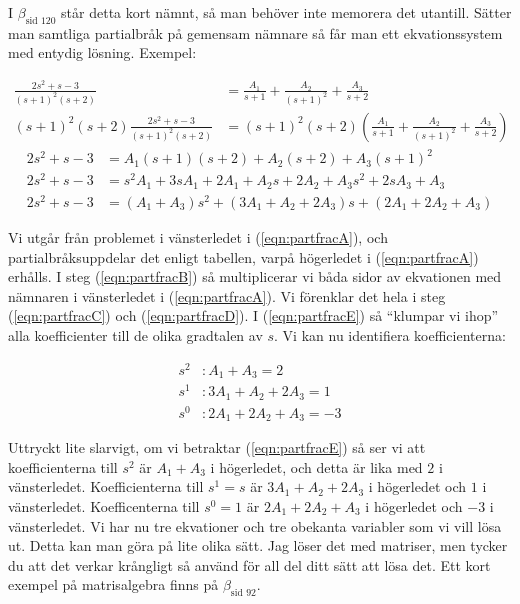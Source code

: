 \documentclass[a4paper]{article}
\newcommand{\mhb}[1]{$\beta_{\text{#1}}$}     %
\begin{document}
I \mhb{sid 120} står detta kort nämnt, så man behöver inte memorera det utantill. Sätter man samtliga partialbråk på gemensam nämnare så får man ett ekvationssystem med entydig lösning. Exempel:

\begin{align}
  \frac{2s^2 + s -3}{(s+1)^2(s+2)} &= \frac{A_1}{s+1} + \frac{A_2}{(s+1)^2} + \frac{A_3}{s+2} \label{eqn:partfracA}\\%
  (s+1)^2(s+2) \frac{2s^2 + s -3}{(s+1)^2(s+2)} &= (s+1)^2(s+2) \left( \frac{A_1}{s+1} + \frac{A_2}{(s+1)^2} + \frac{A_3}{s+2} \right) \label{eqn:partfracB}%
\end{align}
\vspace{-7mm}
\begin{align}
  2s^2 + s -3 &= A_1(s+1)(s+2) + A_2(s+2) + A_3(s+1)^2 \label{eqn:partfracC}\\%
  2s^2 + s -3 &= s^2A_1 + 3sA_1 + 2A_1 + A_2s + 2A_2 + A_3s^2 + 2sA_3 + A_3 \label{eqn:partfracD}\\%
  2s^2 + s -3 &= (A_1 + A_3)s^2 + (3A_1 + A_2 + 2A_3)s + (2A_1 + 2A_2 + A_3) \label{eqn:partfracE}%
\end{align}

Vi utgår från problemet i vänsterledet i (\ref{eqn:partfracA}), och partialbråksuppdelar det enligt tabellen, varpå högerledet i (\ref{eqn:partfracA}) erhålls. I steg (\ref{eqn:partfracB}) så multiplicerar vi båda sidor av ekvationen med nämnaren i vänsterledet i (\ref{eqn:partfracA}). Vi förenklar det hela i steg (\ref{eqn:partfracC}) och (\ref{eqn:partfracD}). I (\ref{eqn:partfracE}) så ``klumpar vi ihop'' alla koefficienter till de olika gradtalen av $s$. Vi kan nu identifiera koefficienterna:

\begin{align*}
  s^2 &: A_1 + A_3 = 2\\
  s^1 &: 3A_1 + A_2 + 2A_3 = 1\\
  s^0 &: 2A_1 + 2A_2 + A_3 = -3
\end{align*}

Uttryckt lite slarvigt, om vi betraktar (\ref{eqn:partfracE}) så ser vi att koefficienterna till $s^2$ är $A_1 + A_3$ i högerledet, och detta är lika med $2$ i vänsterledet. Koefficienterna till $s^1 = s$ är $3A_1 + A_2 + 2A_3$ i högerledet och $1$ i vänsterledet. Koefficenterna till $s^0 = 1$ är $2A_1 + 2A_2 + A_3$ i högerledet och $-3$ i vänsterledet. Vi har nu tre ekvationer och tre obekanta variabler som vi vill lösa ut. Detta kan man göra på lite olika sätt. Jag löser det med matriser, men tycker du att det verkar krångligt så använd för all del ditt sätt att lösa det. Ett kort exempel på matrisalgebra finns på \mhb{sid 92}.
\end{document}
